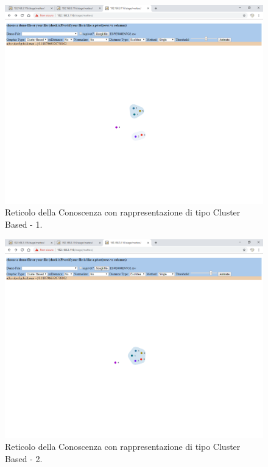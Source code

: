 \noindent
\begin{figure}[H]
\centering
	\includegraphics[width=1\linewidth]{./image/reticoloNonCorretto2.png}
	\caption{Reticolo della Conoscenza con rappresentazione di tipo Cluster Based - 1.}
	\label{Reticolo della Conoscenza con rappresentazione di tipo Cluster Based - 1.}
\end{figure}
\noindent
\begin{figure}[H]
\centering
	\includegraphics[width=1\linewidth]{./image/reticoloNonCorretto3.png}
	\caption{Reticolo della Conoscenza con rappresentazione di tipo Cluster Based - 2.}
	\label{Reticolo della Conoscenza con rappresentazione di tipo Cluster Based - 2.}
\end{figure}
